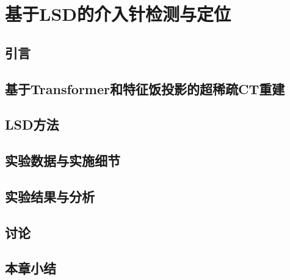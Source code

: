 
\chapter{基于LSD的介入针检测与定位}

\section{引言}

\section{基于Transformer和特征饭投影的超稀疏CT重建}


\section{LSD方法}

\section{实验数据与实施细节}

\section{实验结果与分析}

\section{讨论}

\section{本章小结}

